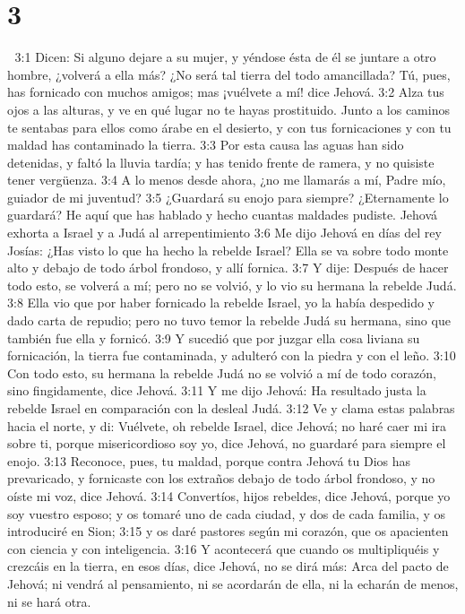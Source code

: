 \chapter{3}


3:1 Dicen: Si alguno dejare a su mujer, y yéndose ésta de él se juntare a otro hombre, ¿volverá a ella más? ¿No será tal tierra del todo amancillada? Tú, pues, has fornicado con muchos amigos; mas ¡vuélvete a mí! dice Jehová.  
3:2 Alza tus ojos a las alturas, y ve en qué lugar no te hayas prostituido. Junto a los caminos te sentabas para ellos como árabe en el desierto, y con tus fornicaciones y con tu maldad has contaminado la tierra.  
3:3 Por esta causa las aguas han sido detenidas, y faltó la lluvia tardía; y has tenido frente de ramera, y no quisiste tener vergüenza.  
3:4 A lo menos desde ahora, ¿no me llamarás a mí, Padre mío, guiador de mi juventud?  
3:5 ¿Guardará su enojo para siempre? ¿Eternamente lo guardará? He aquí que has hablado y hecho cuantas maldades pudiste.  
Jehová exhorta a Israel y a Judá al arrepentimiento  
3:6 Me dijo Jehová en días del rey Josías: ¿Has visto lo que ha hecho la rebelde Israel? Ella se va sobre todo monte alto y debajo de todo árbol frondoso, y allí fornica.  
3:7 Y dije: Después de hacer todo esto, se volverá a mí; pero no se volvió, y lo vio su hermana la rebelde Judá.  
3:8 Ella vio que por haber fornicado la rebelde Israel, yo la había despedido y dado carta de repudio; pero no tuvo temor la rebelde Judá su hermana, sino que también fue ella y fornicó.  
3:9 Y sucedió que por juzgar ella cosa liviana su fornicación, la tierra fue contaminada, y adulteró con la piedra y con el leño.  
3:10 Con todo esto, su hermana la rebelde Judá no se volvió a mí de todo corazón, sino fingidamente, dice Jehová.  
3:11 Y me dijo Jehová: Ha resultado justa la rebelde Israel en comparación con la desleal Judá.  
3:12 Ve y clama estas palabras hacia el norte, y di: Vuélvete, oh rebelde Israel, dice Jehová; no haré caer mi ira sobre ti, porque misericordioso soy yo, dice Jehová, no guardaré para siempre el enojo.  
3:13 Reconoce, pues, tu maldad, porque contra Jehová tu Dios has prevaricado, y fornicaste con los extraños debajo de todo árbol frondoso, y no oíste mi voz, dice Jehová.  
3:14 Convertíos, hijos rebeldes, dice Jehová, porque yo soy vuestro esposo; y os tomaré uno de cada ciudad, y dos de cada familia, y os introduciré en Sion;  
3:15 y os daré pastores según mi corazón, que os apacienten con ciencia y con inteligencia.  
3:16 Y acontecerá que cuando os multipliquéis y crezcáis en la tierra, en esos días, dice Jehová, no se dirá más: Arca del pacto de Jehová; ni vendrá al pensamiento, ni se acordarán de ella, ni la echarán de menos, ni se hará otra.  
